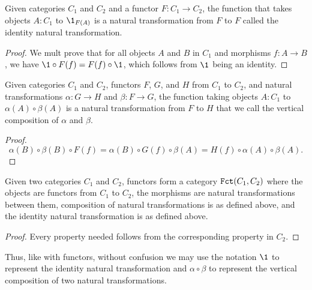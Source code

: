 \documentclass[../../math.tex]{subfiles}
\begin{document}
\begin{theorem}
    Given categories $C_1$ and $C_2$ and a functor $F : C_1 \to C_2$, the
    function that takes objects $A : C_1$ to $\1_{F(A)}$ is a natural
    transformation from $F$ to $F$ called the identity natural transformation.
\end{theorem}
\begin{proof}
    We mult prove that for all objects $A$ and $B$ in $C_1$ and morphisms $f : A
    \to B$, we have $\1 \circ F(f) = F(f) \circ \1$, which follows from $\1$
    being an identity.
\end{proof}

\begin{theorem}
    Given categories $C_1$ and $C_2$, functors $F$, $G$, and $H$ from $C_1$
    to $C_2$, and natural transformations $\alpha : G \to H$ and $\beta : F \to
    G$, the function taking objects $A : C_1$ to $\alpha(A) \circ \beta(A)$ is a
    natural transformation from $F$ to $H$ that we call the vertical composition
    of $\alpha$ and $\beta$.
\end{theorem}
\begin{proof}
    \[
        \alpha(B) \circ \beta(B) \circ F(f) =
        \alpha(B) \circ G(f) \circ \beta(A) =
        H(f) \circ \alpha(A) \circ \beta(A).
    \]
\end{proof}

\begin{theorem}
    Given two categories $C_1$ and $C_2$, functors form a category $\Fct(C_1,
    C_2)$ where the objects are functors from $C_1$ to $C_2$, the morphisms are
    natural transformations between them, composition of natural transformations
    is as defined above, and the identity natural transformation is as defined
    above.
\end{theorem}
\begin{proof}
    Every property needed follows from the corresponding property in $C_2$.
\end{proof}

Thus, like with functors, without confusion we may use the notation $\1$
to represent the identity natural transformation and $\alpha \circ \beta$ to
represent the vertical composition of two natural transformations.
\end{document}
